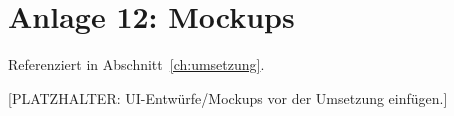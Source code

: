 \section*{Anlage 12: Mockups}
\label{anh:mockups}
Referenziert in Abschnitt~\ref{ch:umsetzung}.

[PLATZHALTER: UI-Entw\"urfe/Mockups vor der Umsetzung einf\"ugen.]

